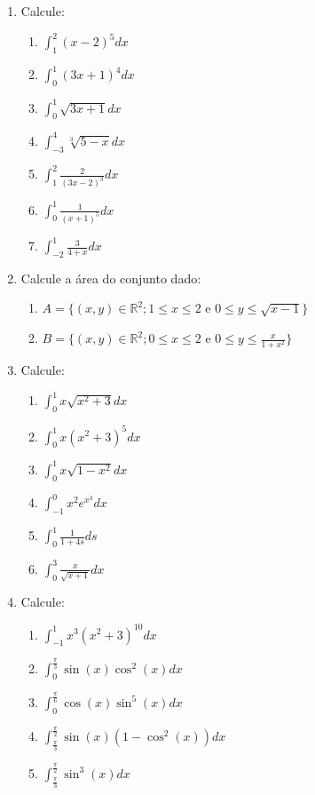 \documentclass[oneside,a4paper,12pt]{article}
\begin{document}
\begin{enumerate}
	\item Calcule:
	\begin{multicols}{2}
		\begin{enumerate}
			\item $\displaystyle \int_{1}^{2}(x-2)^5dx$
			\item $\displaystyle \int_{0}^{1}(3x+1)^4dx$
			\item $\displaystyle \int_{0}^{1}\sqrt{3x+1}dx$
			\item $\displaystyle \int_{-3}^{4}\sqrt[3]{5-x}dx$
			\item $\displaystyle \int_{1}^{2}\frac{2}{(3x - 2)^3}dx$
			\item $\displaystyle \int_{0}^{1}\frac{1}{(x+1)^5}dx$
			\item $\displaystyle \int_{-2}^{1}\frac{3}{4+x}dx$
		\end{enumerate}
	\end{multicols}

	\item Calcule a área do conjunto dado:
		\begin{enumerate}
			\item $A = \{ (x,y) \in \mathbb{R}^2; 1 \leq x \leq 2 \text{ e } 0 \leq y \leq \sqrt{x-1} \}$
			\item $B = \{ (x,y) \in \mathbb{R}^2; 0 \leq x \leq 2 \text{ e } 0 \leq y \leq \frac{x}{1+ x^2} \}$
		\end{enumerate}
	
	\item Calcule:
	\begin{multicols}{2}
		\begin{enumerate}
			\item $\displaystyle \int_{0}^{1}x\sqrt{x^2 + 3}dx$
			\item $\displaystyle \int_{0}^{1}x(x^2 +3)^5dx$
			\item $\displaystyle \int_{0}^{1}x\sqrt{1-x^2}dx$
			\item $\displaystyle \int_{-1}^{0}x^2e^{x^3}dx$
			\item $\displaystyle \int_{0}^{1}\frac{1}{1+4s}ds$
			\item $\displaystyle \int_{0}^{3}\frac{x}{\sqrt{x+1}}dx$
		\end{enumerate}
	\end{multicols}
	
	\item Calcule:
	\begin{multicols}{2}
		\begin{enumerate}
			\item $\displaystyle \int_{-1}^{1}x^3(x^2+3)^{10} dx$
			\item $\displaystyle \int_{0}^{\frac{\pi}{3}}\sin(x)\cos^2(x)dx$
			\item $\displaystyle \int_{0}^{\frac{\pi}{6}}\cos(x)\sin^5(x)dx$
			\item $\displaystyle \int_{\frac{\pi}{3}}^{\frac{\pi}{2}}\sin(x)(1-\cos^2(x))dx$
			\item $\displaystyle \int_{\frac{\pi}{3}}^{\frac{\pi}{2}}\sin^3(x)dx$
		\end{enumerate}
	\end{multicols}
	

\end{enumerate}
\end{document}
